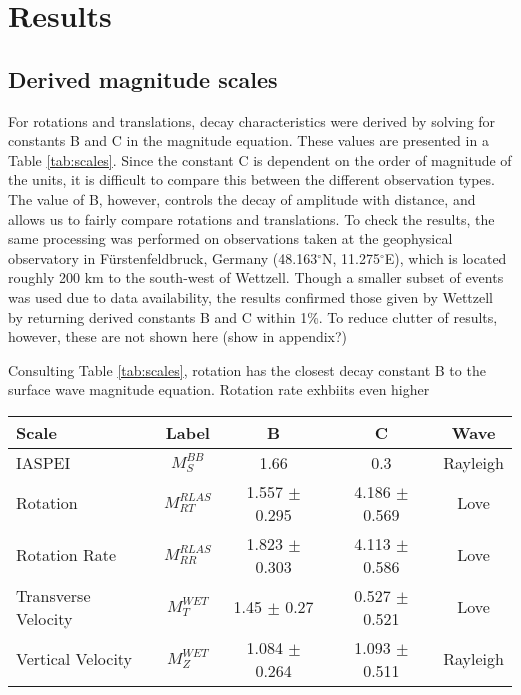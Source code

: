 \documentclass{gji}
\begin{document}
\section{Results}
\subsection{Derived magnitude scales}
For rotations and translations, decay characteristics were derived by solving for constants B and C in the magnitude equation. These values are presented in a Table \ref{tab:scales}. Since the constant C is dependent on the order of magnitude of the units, it is difficult to compare this between the different observation types. The value of B, however, controls the decay of amplitude with distance, and allows us to fairly compare rotations and translations. To check the results, the same processing was performed on observations taken at the geophysical observatory in F\"urstenfeldbruck, Germany (48.163$^\circ$N, 11.275$^\circ$E), which is located roughly 200 km to the south-west of Wettzell. Though a smaller subset of events was used due to data availability, the results confirmed those given by Wettzell by returning derived constants B and C within 1\%. To reduce clutter of results, however, these are not shown here (show in appendix?)

Consulting Table \ref{tab:scales}, rotation has the closest decay constant B to the surface wave magnitude equation. Rotation rate exhbiits even higher 


\begin{table*}
\begin{minipage}{115mm}
	\begin{center}
		\begin{tabular}{ |l|c|c|c|c| } 
		        \bf{Scale} & \bf{Label} & \bf{B} & \bf{C}  & \bf{Wave}\\ \hline
	IASPEI & $M_{S}^{BB}$ & 1.66 & 0.3  & Rayleigh \\ \hline
        Rotation  & $M^{RLAS}_{RT}$ & 1.557 $\pm$ 0.295 & 4.186 $\pm$ 0.569  & Love \\ \hline
	Rotation Rate & $M^{RLAS}_{RR}$ & 1.823 $\pm$ 0.303 & 4.113 $\pm$ 0.586  & Love\\ \hline 
        Transverse Velocity & $M^{WET}_T$ & 1.45 $\pm$ 0.27 & 0.527 $\pm$ 0.521 & Love \\ \hline
        Vertical Velocity  & $M^{WET}_Z$ & 1.084 $\pm$ 0.264 & 1.093 $\pm$ 0.511  & Rayleigh \\ \hline
		\end{tabular}
		
    		\caption{Magnitude scales and derived constants with 95\% confidence intervals for observations at station RLAS/WET, for equations of the form $M = log_{10}(V/2\pi) + B\cdot log_{10}(\Delta) + C$. The final column gives consideration to the wave type that each instrument component should provide a proxy for.}
		\label{tab:scales}
	\end{center}
	\end{minipage}
\end{table*}
\end{document}
